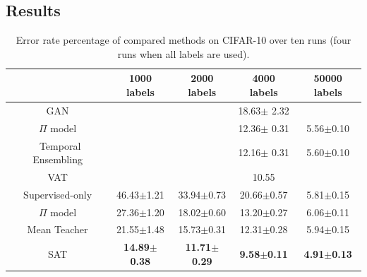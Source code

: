 \documentclass[10pt,journal,compsoc,twoside]{IEEEtran}
\begin{document}

\subsection{Results}

\begin{table}
\caption{Error rate percentage of compared methods on CIFAR-10 over ten runs (four runs when all labels are used). }\label{tab:cifar10}
\vspace{2mm}
\centering
 \begin{tabular}{ccccc} \toprule
   &1000 labels&2000 labels&4000 labels&50000 labels\\ \midrule
GAN \cite{salimans2016improved}&&&18.63$\pm$ 2.32 \\
$\Pi$ model \cite{laine2016temporal}&&&12.36$\pm$ 0.31 &5.56$\pm$0.10  \\ \
Temporal Ensembling \cite{laine2016temporal}&&&12.16$\pm$ 0.31 &5.60$\pm$0.10\\
VAT \cite{miyato2018virtual} &&&10.55\\
Supervised-only&46.43$\pm$1.21&33.94$\pm 0.73$&20.66$\pm$0.57&5.81$\pm$0.15\\
$\Pi$ model \cite{tarvainen2017mean} &27.36$\pm$1.20&18.02$\pm$0.60&13.20$\pm$0.27&6.06$\pm$0.11\\
Mean Teacher \cite{tarvainen2017mean} &21.55$\pm$1.48&15.73$\pm$0.31&12.31$\pm$0.28&5.94$\pm$0.15\\\midrule
SAT&{\bf 14.89$\pm$0.38}&{\bf 11.71$\pm$0.29} &\textbf{9.58$\pm$0.11}&{\bf 4.91$\pm$0.13}\\
\bottomrule
\end{tabular}
\end{table}
\end{document}

